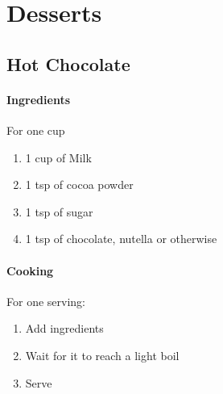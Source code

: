 \chapter{Desserts}

\section{Hot Chocolate}
\subsubsection{Ingredients}
For one cup
\begin{enumerate}
    \item 1 cup of Milk
    \item 1 tsp of cocoa powder
    \item 1 tsp of sugar
    \item 1 tsp of chocolate, nutella or otherwise
\end{enumerate}

\subsubsection{Cooking}
For one serving:
\begin{enumerate}
    \item Add ingredients
    \item Wait for it to reach a light boil
    \item Serve
\end{enumerate}
